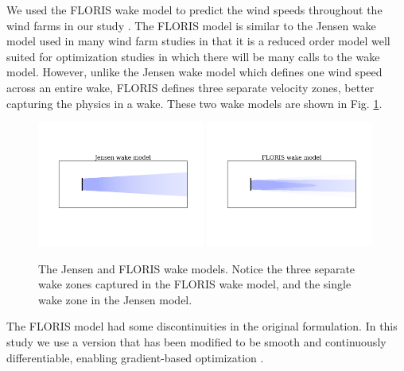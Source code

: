 We used the FLORIS wake model to predict the wind speeds throughout the wind farms in our study \citep{gebraad2016wind}. The FLORIS model is similar to the Jensen wake model used in many wind farm studies \citep{jensen1983note} in that it is a reduced order model well suited for optimization studies in which there will be many calls to the wake model. However, unlike the Jensen wake model which defines one wind speed across an entire wake, FLORIS defines three separate velocity zones, better capturing the physics in a wake. These two wake models are shown in Fig. \ref{wake_models}.
\begin{figure}[htbp]
  \centering
   \includegraphics[trim={0 4cm 0 0}, clip,width=0.49\textwidth]{Figures/Jensen.png}\label{jensen}
   \includegraphics[trim={0 4cm 0 0}, clip,width=0.49\textwidth]{Figures/Floris.png}\label{floris}
  \caption{\label{wake_models} The Jensen and FLORIS wake models. Notice the three separate wake zones captured in the FLORIS wake model, and the single wake zone in the Jensen model.}
\end{figure}
The FLORIS model had some discontinuities in the original formulation. In this study we use a version that has been modified to be smooth and continuously differentiable, enabling gradient-based optimization \citep{thomas2017improving}.


